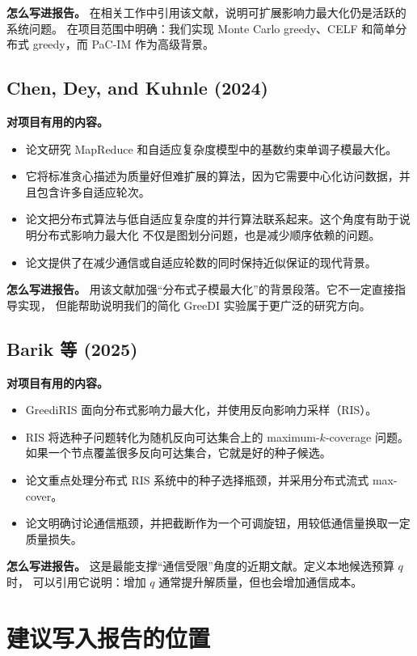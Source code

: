 \documentclass[UTF8,10pt]{ctexart}
\begin{document}
\textbf{怎么写进报告。} 在相关工作中引用该文献，说明可扩展影响力最大化仍是活跃的系统问题。
在项目范围中明确：我们实现 Monte Carlo greedy、CELF 和简单分布式 greedy，而 PaC-IM 作为高级背景。

\subsection{Chen, Dey, and Kuhnle (2024)}

\textbf{对项目有用的内容。}
\begin{itemize}
\item 论文研究 MapReduce 和自适应复杂度模型中的基数约束单调子模最大化。
\item 它将标准贪心描述为质量好但难扩展的算法，因为它需要中心化访问数据，并且包含许多自适应轮次。
\item 论文把分布式算法与低自适应复杂度的并行算法联系起来。这个角度有助于说明分布式影响力最大化
不仅是图划分问题，也是减少顺序依赖的问题。
\item 论文提供了在减少通信或自适应轮数的同时保持近似保证的现代背景。
\end{itemize}

\textbf{怎么写进报告。} 用该文献加强“分布式子模最大化”的背景段落。它不一定直接指导实现，
但能帮助说明我们的简化 GreeDI 实验属于更广泛的研究方向。

\subsection{Barik 等 (2025)}

\textbf{对项目有用的内容。}
\begin{itemize}
\item GreediRIS 面向分布式影响力最大化，并使用反向影响力采样（RIS）。
\item RIS 将选种子问题转化为随机反向可达集合上的 maximum-$k$-coverage 问题。
如果一个节点覆盖很多反向可达集合，它就是好的种子候选。
\item 论文重点处理分布式 RIS 系统中的种子选择瓶颈，并采用分布式流式 max-cover。
\item 论文明确讨论通信瓶颈，并把截断作为一个可调旋钮，用较低通信量换取一定质量损失。
\end{itemize}

\textbf{怎么写进报告。} 这是最能支撑“通信受限”角度的近期文献。定义本地候选预算 $q$ 时，
可以引用它说明：增加 $q$ 通常提升解质量，但也会增加通信成本。

\section{建议写入报告的位置}
\end{document}
